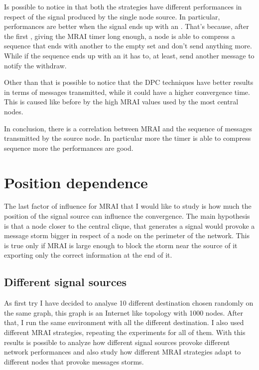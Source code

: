 Is possible to notice in  that
both the strategies have different performances in respect of the signal 
produced by the single node source.
In particular, performances are better when the signal ends up with an .
That's because, after the first , giving the \ac{MRAI} timer long enough, 
a node is able to compress a sequence that ends with another  to the
empty set and don't send anything more.
While if the sequence ends up with an  it has to, at least, send another
message to notify the withdraw.

Other than that is possible to notice that the \ac{DPC} techniques have better
results in terms of messages transmitted, while it could have a higher 
convergence time.
This is caused like before by the high \ac{MRAI} values used by the most
central nodes.

In conclusion, there is a correlation between \ac{MRAI} and the sequence of messages
transmitted by the source node.
In particular more the timer is able to compress sequence more the performances
are good.


\section{Position dependence}
\label{sec:position_dependance}

The last factor of influence for \ac{MRAI} that I would like to study is how much
the position of the signal source can influence the convergence.
The main hypothesis is that a node closer to the central clique, that generates
a signal would provoke a message storm bigger in respect of a node on the perimeter
of the network.
This is true only if \ac{MRAI} is large enough to block the storm near the source
of it exporting only the correct information at the end of it.

\subsection{Different signal sources}
\label{subsec:different_destinations}

As first try I have decided to analyse \num{10} different destination chosen randomly
on the same graph, this graph is an Internet like topology with \num{1000} nodes.
After that, I run the same environment with all the different destination.
I also used different \ac{MRAI} strategies, repeating the experiments for all of
them.
With this results is possible to analyze how different signal sources provoke 
different network performances and also study how different \ac{MRAI} strategies
adapt to different nodes that provoke messages storms.


